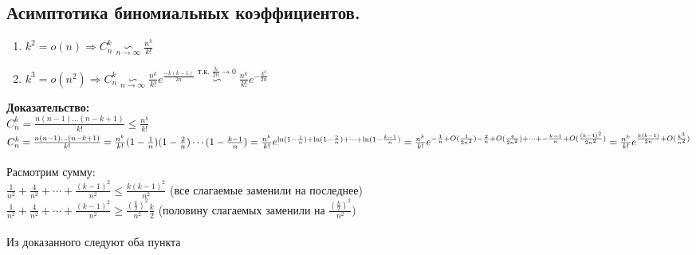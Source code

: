 \documentclass[12pt]{article}
\begin{document}
\subsection{Асимптотика биномиальных коэффициентов.}
\begin{enumerate}
	\item $k^2 = o(n) \Rightarrow C_n^k \underset{n\to\infty}{\backsim} \frac{n^k}{k!}$
	\item $k^3 = o(n^2) \Rightarrow C_n^k \underset{n\to\infty}{\backsim} \frac{n^k}{k!}e^{\frac{-k(k-1)}{2n}} \overset{\text{т.к. $\frac{k}{2n} \to 0$}}{\backsim} \frac{n^k}{k!}e^{-\frac{k^2}{2n}}$
\end{enumerate}
	\textbf{Доказательство:}\\
		$C_n^k = \frac{n(n-1)\dotsc(n-k+1)}{k!} \leqslant \frac{n^k}{k!}$\\
		$C_n^k = \frac{n(n-1)\dotsc(n-k+1)}{k!} = \frac{n^k}{k!}(1-\frac{1}{n})(1-\frac{2}{n})\dotsm(1-\frac{k-1}{n}) = 
		\frac{n^k}{k!}e^{\ln(1-\frac{1}{n}) + \ln(1 - \frac{2}{n}) + \dotsb + \ln(1 - \frac{k-1}{n})} =\\
		\frac{n^k}{k!}e^{-\frac{1}{n} + O(\frac{1}{2n^2}) - \frac{2}{n} + O(\frac{4}{2n^2}) + \dotsb + -\frac{k-1}{n} + O(\frac{(k-1)^2}{2n^2})} =
		\frac{n^k}{k!}e^{\frac{k(k-1)}{2n} + O(\frac{k^3}{n^2})}$\\\\

		Расмотрим сумму:\\
		$\frac{1}{n^2} + \frac{4}{n^2} + \dotsb + \frac{(k-1)^2}{n^2} \leqslant \frac{k(k-1)^2}{n^2}$ \quad (все слагаемые заменили на последнее)\\
		$\frac{1}{n^2} + \frac{4}{n^2} + \dotsb + \frac{(k-1)^2}{n^2} \geqslant \frac{(\frac{k}{2})^2}{n^2}\frac{k}{2}$ \quad (половину слагаемых заменили на $\frac{(\frac{k}{2})^2}{n^2})$\\\\
		Из доказанного следуют оба пункта\\
	\qedsymbol
\end{document}
